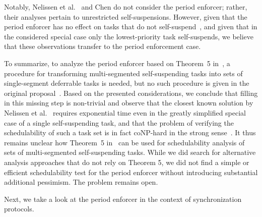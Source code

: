 Notably, Nelissen et al.~\cite{ecrts15nelissen} and Chen \cite{RTSS2016-suspension} do not consider the period enforcer; rather, their analyses pertain to unrestricted self-suspensions. However, given that the period enforcer has no effect on tasks that do not self-suspend~\cite{Raj:suspension1991}, and given that in the considered special case only the lowest-priority task self-suspends, we believe that these observations transfer to the period enforcement case.

To summarize, to analyze the period enforcer based on Theorem~5 in~\cite{Raj:suspension1991}, a procedure for transforming multi-segmented self-suspending tasks into sets of single-segment deferrable tasks is needed, but no such procedure is given in the original proposal~\cite{Raj:suspension1991}.
%
Based on the presented considerations, we conclude that filling in this missing step is non-trivial and observe that the closest known solution by Nelissen et al.~\cite{ecrts15nelissen} requires exponential time even in the greatly simplified special case of a single self-suspending task, and that the problem of verifying the schedulability of such a task set is in fact coNP-hard in the strong sense~\cite{RTSS2016-suspension}. It thus remains unclear how Theorem~5 in~\cite{Raj:suspension1991} can be used for schedulability analysis of sets of multi-segmented self-suspending tasks. 
While we did search for alternative analysis approaches that do not rely on Theorem 5, we did not find a simple or efficient schedulability test for the period enforcer without introducing substantial additional pessimism.  The problem remains open. 

Next, we take a look at the period enforcer in the context of synchronization protocols.




